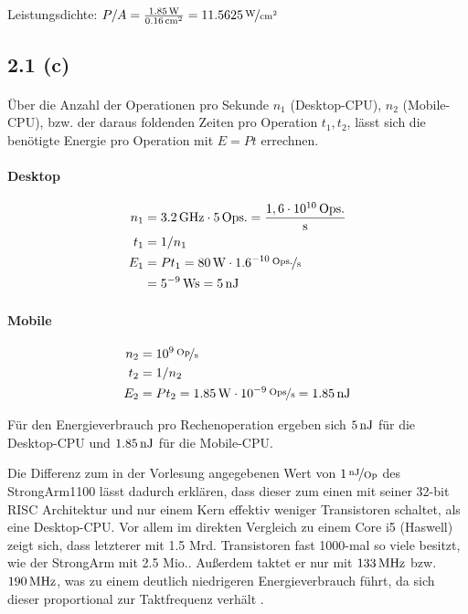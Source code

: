 \documentclass[11pt,a4paper]{article}
\begin{document}
Leistungsdichte: $P/A = \frac{\unit[1.85]{W}}{\unit[0.16]{cm^2}} = \unitfrac[11.5625]{W}{cm^2}$

\subsection{2.1 (c)}

\paragraph{}
Über die Anzahl der Operationen pro Sekunde $n_1$ (Desktop-CPU), $n_2$ (Mobile-CPU), bzw. der daraus foldenden Zeiten pro Operation $t_1, t_2$, lässt sich die benötigte Energie pro Operation mit $E = Pt$ errechnen.

\paragraph{Desktop}
\begin{align*}
n_1 &= \unit[3.2]{GHz} \cdot \unit[5]{Ops.} = \frac{1,6 \cdot \unit[10^{10}]{Ops.}}{\unit{s}}\\
t_1 &= 1/n_1\\
E_1 &= Pt_1 = \unit[80]{W} \cdot \unitfrac[1.6^{-10}]{Ops.}{s}\\
&= \unit[5^{-9}]{Ws} = \unit[5]{nJ}\\
\end{align*}

\paragraph{Mobile}
\begin{align*}
n_2 &= \unitfrac[10^9]{Op}{s}\\
t_2 &= 1/n_2\\
E_2 &= Pt_2 = \unit[1.85]{W} \cdot \unitfrac[10^{-9}]{Ops}{s} = \unit[1.85]{nJ}
\end{align*}

Für den Energieverbrauch pro Rechenoperation ergeben sich $\unit[5]{nJ}$ für die Desktop-CPU und $\unit[1.85]{nJ}$ für die Mobile-CPU.

Die Differenz zum in der Vorlesung angegebenen Wert von $\unitfrac[1]{nJ}{Op}$ des StrongArm1100 lässt dadurch erklären, dass dieser zum einen mit seiner 32-bit RISC Architektur und nur einem Kern effektiv weniger Transistoren schaltet, als eine Desktop-CPU. Vor allem im direkten Vergleich zu einem Core i5 (Haswell) zeigt sich, dass letzterer mit 1.5 Mrd. Transistoren fast 1000-mal so viele besitzt, wie der StrongArm mit 2.5 Mio.. Außerdem taktet er nur mit $\unit[133]{MHz}$ bzw. $\unit[190]{MHz}$, was zu einem deutlich niedrigeren Energieverbrauch führt, da sich dieser proportional zur Taktfrequenz verhält\cite{wiki:1} \cite{intel:1}.
\end{document}
